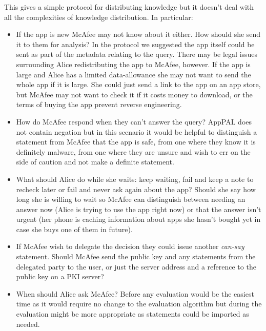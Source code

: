 \documentclass[a4paper]{scrartcl}
\begin{document}
This gives a simple protocol for distributing knowledge but it doesn't deal with all the complexities of knowledge distribution.
In particular:
\begin{itemize}
  \item
    If the app is new McAfee may not know about it either.
    How should she send it to them for analysis?
    In the protocol we suggested the app itself could be sent as part of the metadata relating to the query.
    There may be legal issues surrounding Alice redistributing the app to McAfee, however.
    If the app is large and Alice has a limited data-allowance she may not want to send the whole app if it is large.
    She could just send a link to the app on an app store, but McAfee may not want to check it if it costs money to download, or the terms of buying the app prevent reverse engineering.
  \item
    How do McAfee respond when they can't answer the query?
    AppPAL does not contain negation but in this scenario it would be helpful to distinguish a statement from McAfee that the app is safe, from one where they know it is definitely malware, from one where they are unsure and wish to err on the side of caution and not make a definite statement.

  \item
    What should Alice do while she waits: keep waiting, fail and keep a note to recheck later or fail and never ask again about the app?
    Should she say how long she is willing to wait so McAfee can distinguish between needing an answer now (Alice is trying to use the app right now) or that the answer isn't urgent (her phone is caching information about apps she hasn't bought yet in case she buys one of them in future).
  \item
    If McAfee wish to delegate the decision they could issue another \emph{can-say} statement.
    Should McAfee send the public key and any statements from the delegated party to the user, or just the server address and a reference to the public key on a PKI server?
  \item
    When should Alice ask McAfee?
    Before any evaluation would be the easiest time as it would require no change to the evaluation algorithm but during the evaluation might be more appropriate as statements could be imported as needed.
\end{itemize}
\end{document}
